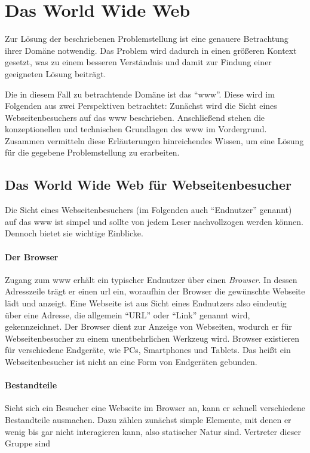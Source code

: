 \section{Das World Wide Web}
    \label{section:TheWWW}
    Zur Lösung der beschriebenen Problemstellung ist eine genauere
    Betrachtung ihrer Domäne notwendig.
    Das Problem wird dadurch in einen größeren Kontext gesetzt,
    was zu einem besseren Verständnis und damit zur Findung
    einer geeigneten Lösung beiträgt.

    Die in diesem Fall zu betrachtende Domäne ist das "`\gls{www}"'.
    Diese wird im Folgenden aus zwei Perspektiven betrachtet:
    Zunächst wird die Sicht eines Webseitenbesuchers auf das \gls{www} beschrieben.
    Anschließend stehen die konzeptionellen und technischen Grundlagen
    des \gls{www} im Vordergrund.
    Zusammen vermitteln diese Erläuterungen hinreichendes Wissen,
    um eine Lösung für die gegebene Problemstellung zu erarbeiten.

    \subsection{Das World Wide Web für Webseitenbesucher}
        \label{section:enduserViewOnWWW}
        Die Sicht eines Webseitenbesuchers (im Folgenden auch "`Endnutzer"' genannt)
        auf das \gls{www} ist simpel und sollte von jedem Leser nachvollzogen werden können.
        Dennoch bietet sie wichtige Einblicke.

        \paragraph*{Der Browser}
        Zugang zum \gls{www} erhält ein typischer Endnutzer über einen \textit{Browser}.
        In dessen Adresszeile trägt er einen \gls{url} ein,
        woraufhin der Browser die gewünschte Webseite lädt und anzeigt.
        Eine Webseite ist aus Sicht eines Endnutzers also eindeutig über eine
        Adresse, die allgemein "`URL"' oder "`Link"' genannt wird, gekennzeichnet.
        Der Browser dient zur Anzeige von Webseiten, wodurch er für Webseitenbesucher
        zu einem unentbehrlichen Werkzeug wird.
        Browser existieren für verschiedene Endgeräte,
        wie PCs, Smartphones und Tablets.
        Das heißt ein Webseitenbesucher ist nicht an eine Form von Endgeräten gebunden.

        \paragraph*{Bestandteile}
        Sieht sich ein Besucher eine Webseite im Browser an,
        kann er schnell verschiedene Bestandteile ausmachen.
        Dazu zählen zunächst simple Elemente, mit denen er wenig bis gar nicht
        interagieren kann, also statischer Natur sind.
        Vertreter dieser Gruppe sind

